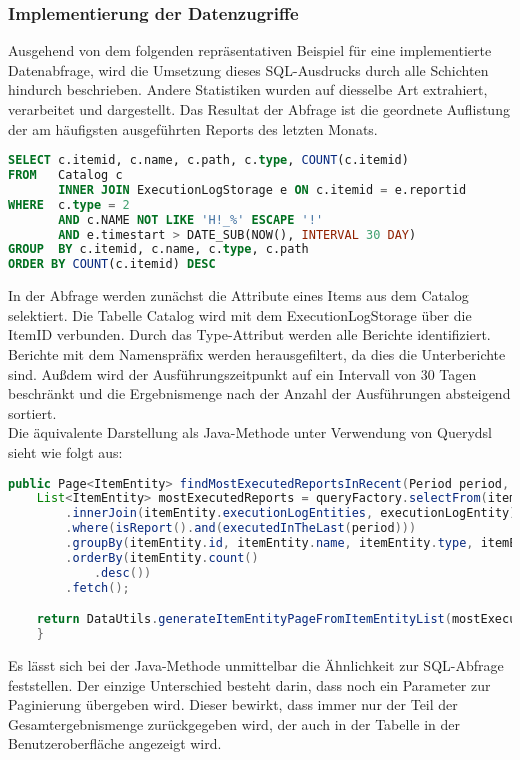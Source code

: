 \subsubsection{Implementierung der Datenzugriffe}
\label{sec:ImplementierungDatenzugriffe}
Ausgehend von dem folgenden repräsentativen Beispiel für eine implementierte Datenabfrage, wird die Umsetzung dieses SQL-Ausdrucks durch alle Schichten hindurch beschrieben. Andere Statistiken wurden auf diesselbe Art extrahiert, verarbeitet und dargestellt. Das Resultat der Abfrage ist die geordnete Auflistung der am häufigsten ausgeführten Reports des letzten Monats.
\begin{lstlisting}[language=SQL,caption={SQL-Abfrage}]
SELECT c.itemid, c.name, c.path, c.type, COUNT(c.itemid)
FROM   Catalog c 
       INNER JOIN ExecutionLogStorage e ON c.itemid = e.reportid 
WHERE  c.type = 2
       AND c.NAME NOT LIKE 'H!_%' ESCAPE '!'
       AND e.timestart > DATE_SUB(NOW(), INTERVAL 30 DAY)
GROUP  BY c.itemid, c.name, c.type, c.path 
ORDER BY COUNT(c.itemid) DESC
\end{lstlisting}
In der Abfrage werden zunächst die Attribute eines Items aus dem Catalog selektiert. Die Tabelle Catalog wird mit dem ExecutionLogStorage über die ItemID verbunden. Durch das Type-Attribut werden alle Berichte identifiziert. Berichte mit dem Namenspräfix  werden herausgefiltert, da dies die Unterberichte sind. Außdem wird der Ausführungszeitpunkt auf ein Intervall von 30 Tagen beschränkt und die Ergebnismenge nach der Anzahl der Ausführungen absteigend sortiert.\\
Die äquivalente Darstellung als Java-Methode unter Verwendung von Querydsl sieht wie folgt aus:
\begin{lstlisting}[language=Java,caption={findMostExecutedReportsInRecent()},label=l:querydsl]
	public Page<ItemEntity> findMostExecutedReportsInRecent(Period period, Pageable pageable) {
    List<ItemEntity> mostExecutedReports = queryFactory.selectFrom(itemEntity)
        .innerJoin(itemEntity.executionLogEntities, executionLogEntity)
        .where(isReport().and(executedInTheLast(period)))
        .groupBy(itemEntity.id, itemEntity.name, itemEntity.type, itemEntity.path)
        .orderBy(itemEntity.count()
            .desc())
        .fetch();

    return DataUtils.generateItemEntityPageFromItemEntityList(mostExecutedReports, pageable);
  	}
\end{lstlisting}
Es lässt sich bei der Java-Methode unmittelbar die Ähnlichkeit zur SQL-Abfrage feststellen. Der einzige Unterschied besteht darin, dass noch ein Parameter zur Paginierung übergeben wird. Dieser bewirkt, dass immer nur der Teil der Gesamtergebnismenge zurückgegeben wird, der auch in der Tabelle in der Benutzeroberfläche angezeigt wird.


